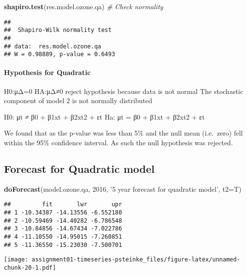 \documentclass[]{article}
\newenvironment{Shaded}{\begin{snugshade}}{\end{snugshade}}
\newcommand{\CommentTok}[1]{\textcolor[rgb]{0.56,0.35,0.01}{\textit{#1}}}
\newcommand{\DataTypeTok}[1]{\textcolor[rgb]{0.13,0.29,0.53}{#1}}
\newcommand{\DecValTok}[1]{\textcolor[rgb]{0.00,0.00,0.81}{#1}}
\newcommand{\KeywordTok}[1]{\textcolor[rgb]{0.13,0.29,0.53}{\textbf{#1}}}
\newcommand{\NormalTok}[1]{#1}
\newcommand{\StringTok}[1]{\textcolor[rgb]{0.31,0.60,0.02}{#1}}
\let\oldparagraph\paragraph
\renewcommand{\paragraph}[1]{\oldparagraph{#1}\mbox{}}
\begin{document}
\begin{Shaded}
\begin{Highlighting}[]
\KeywordTok{shapiro.test}\NormalTok{(res.model.ozone.qa) }\CommentTok{# Check normality}
\end{Highlighting}
\end{Shaded}

\begin{verbatim}
## 
##  Shapiro-Wilk normality test
## 
## data:  res.model.ozone.qa
## W = 0.98889, p-value = 0.6493
\end{verbatim}

\hypertarget{hypothesis-for-quadratic}{%
\paragraph{Hypothesis for Quadratic}\label{hypothesis-for-quadratic}}

H0:μΔ=0 HA:μΔ≠0 reject hypothesis because data is not normal The
stochastic component of model 2 is not normally distributed

H0: μt ≠ β0 + β1xt + β2xt2 + εt Ha: μt = β0 + β1xt + β2xt2 + εt

We found that as the p-value was less than 5\% and the null mean
(i.e.~zero) fell within the 95\% confidence interval. As such the null
hypothesis was rejected.

\hypertarget{forecast-for-quadratic-model}{%
\subsection{Forecast for Quadratic
model}\label{forecast-for-quadratic-model}}

\begin{Shaded}
\begin{Highlighting}[]
\KeywordTok{doForecast}\NormalTok{(model.ozone.qa, }\DecValTok{2016}\NormalTok{, }\StringTok{'5 year forecast for quadratic model'}\NormalTok{, }\DataTypeTok{t2=}\NormalTok{T)}
\end{Highlighting}
\end{Shaded}

\begin{verbatim}
##         fit       lwr       upr
## 1 -10.34387 -14.13556 -6.552180
## 2 -10.59469 -14.40282 -6.786548
## 3 -10.84856 -14.67434 -7.022786
## 4 -11.10550 -14.95015 -7.260851
## 5 -11.36550 -15.23030 -7.500701
\end{verbatim}

\texttt{[image: assignment01-timeseries-psteinke\_files/figure-latex/unnamed-chunk-20-1.pdf]}
\end{document}
